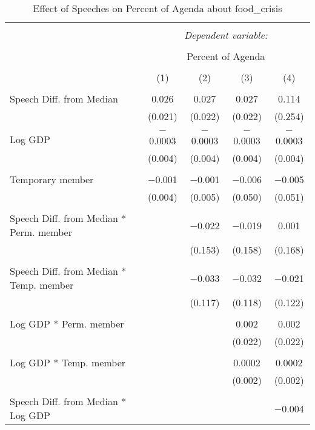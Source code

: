 
\begin{table}[!htbp] \centering 
  \caption{Effect of Speeches on Percent of Agenda about food_crisis} 
  \label{} 
\begin{tabular}{@{\extracolsep{5pt}}lcccc} 
\\[-1.8ex]\hline 
\hline \\[-1.8ex] 
 & \multicolumn{4}{c}{\textit{Dependent variable:}} \\ 
\cline{2-5} 
\\[-1.8ex] & \multicolumn{4}{c}{Percent of Agenda} \\ 
\\[-1.8ex] & (1) & (2) & (3) & (4)\\ 
\hline \\[-1.8ex] 
 Speech Diff. from Median & 0.026 & 0.027 & 0.027 & 0.114 \\ 
  & (0.021) & (0.022) & (0.022) & (0.254) \\ 
  & & & & \\ 
 Log GDP & $-$0.0003 & $-$0.0003 & $-$0.0003 & $-$0.0003 \\ 
  & (0.004) & (0.004) & (0.004) & (0.004) \\ 
  & & & & \\ 
 Temporary member & $-$0.001 & $-$0.001 & $-$0.006 & $-$0.005 \\ 
  & (0.004) & (0.005) & (0.050) & (0.051) \\ 
  & & & & \\ 
 Speech Diff. from Median * Perm. member &  & $-$0.022 & $-$0.019 & 0.001 \\ 
  &  & (0.153) & (0.158) & (0.168) \\ 
  & & & & \\ 
 Speech Diff. from Median * Temp. member &  & $-$0.033 & $-$0.032 & $-$0.021 \\ 
  &  & (0.117) & (0.118) & (0.122) \\ 
  & & & & \\ 
 Log GDP * Perm. member &  &  & 0.002 & 0.002 \\ 
  &  &  & (0.022) & (0.022) \\ 
  & & & & \\ 
 Log GDP * Temp. member &  &  & 0.0002 & 0.0002 \\ 
  &  &  & (0.002) & (0.002) \\ 
  & & & & \\ 
 Speech Diff. from Median * Log GDP &  &  &  & $-$0.004 \\ 

\end{tabular}
\end{table}
